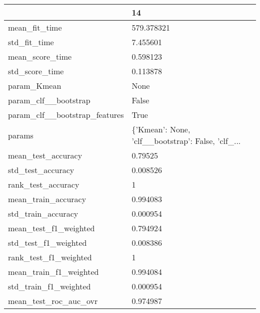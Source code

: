 \begin{tabular}{ll}
\toprule
{} &                                                 14 \\
\midrule
mean\_fit\_time                 &                                         579.378321 \\
std\_fit\_time                  &                                           7.455601 \\
mean\_score\_time               &                                           0.598123 \\
std\_score\_time                &                                           0.113878 \\
param\_Kmean                   &                                               None \\
param\_clf\_\_bootstrap          &                                              False \\
param\_clf\_\_bootstrap\_features &                                               True \\
params                        &  \{'Kmean': None, 'clf\_\_bootstrap': False, 'clf\_... \\
mean\_test\_accuracy            &                                            0.79525 \\
std\_test\_accuracy             &                                           0.008526 \\
rank\_test\_accuracy            &                                                  1 \\
mean\_train\_accuracy           &                                           0.994083 \\
std\_train\_accuracy            &                                           0.000954 \\
mean\_test\_f1\_weighted         &                                           0.794924 \\
std\_test\_f1\_weighted          &                                           0.008386 \\
rank\_test\_f1\_weighted         &                                                  1 \\
mean\_train\_f1\_weighted        &                                           0.994084 \\
std\_train\_f1\_weighted         &                                           0.000954 \\
mean\_test\_roc\_auc\_ovr         &                                           0.974987 \\

\end{tabular}

